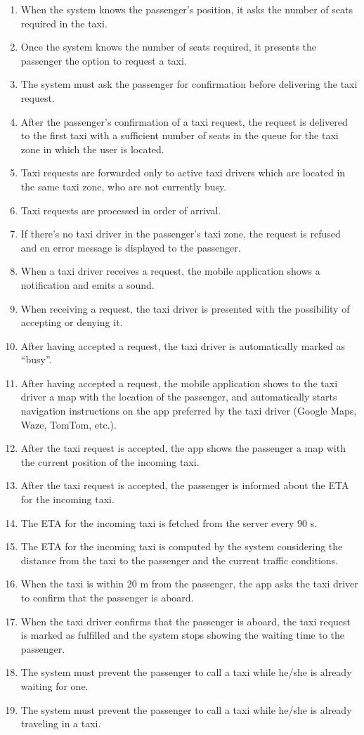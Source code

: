 \begin{enumerate}
	\item When the system knows the passenger's position, it asks the number of seats required in the taxi.
	\item Once the system knows the number of seats required, it presents the passenger the option to request a taxi.
	\item The system must ask the passenger for confirmation before delivering the taxi request.
	\item After the passenger's confirmation of a taxi request, the request is delivered to the first taxi with a sufficient number of seats in the queue for the taxi zone in which the user is located.
	\item Taxi requests are forwarded only to active taxi drivers which are located in the same taxi zone, who are not currently busy.
	\item Taxi requests are processed in order of arrival.
	\item If there's no taxi driver in the passenger's taxi zone, the request is refused and en error message is displayed to the passenger.
	\item When a taxi driver receives a request, the mobile application shows a notification and emits a sound.
	\item When receiving a request, the taxi driver is presented with the possibility of accepting or denying it.
	\item After having accepted a request, the taxi driver is automatically marked as ``busy''.
	\item After having accepted a request, the mobile application shows to the taxi driver a map with the location of the passenger, and automatically starts navigation instructions on the app preferred by the taxi driver (Google Maps, Waze, TomTom, etc.).
	\item After the taxi request is accepted, the app shows the passenger a map with the current position of the incoming taxi.
	\item After the taxi request is accepted, the passenger is informed about the ETA for the incoming taxi.
	\item The ETA for the incoming taxi is fetched from the server every 90 s.
	\item The ETA for the incoming taxi is computed by the system considering the distance from the taxi to the passenger and the current traffic conditions.
	\item When the taxi is within 20 m from the passenger, the app asks the taxi driver to confirm that the passenger is aboard.
	\item When the taxi driver confirms that the passenger is aboard, the taxi request is marked as fulfilled and the system stops showing the waiting time to the passenger.
	\item The system must prevent the passenger to call a taxi while he/she is already waiting for one.
	\item The system must prevent the passenger to call a taxi while he/she is already traveling in a taxi.
\end{enumerate}
